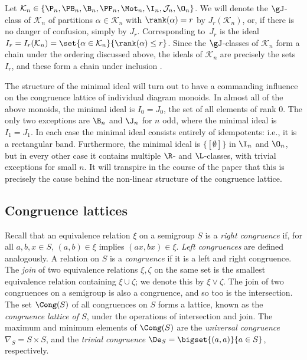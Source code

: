 Let $\mathcal{K}_n\in\{\P_n,\PB_n,\B_n,\PP_n,\Mot_n,\I_n,\mathcal J_n,\O_n\}$.
We will denote the $\gJ$-class of $\mathcal{K}_n$ of partitions $\alpha\in\mathcal{K}_n$ with $\rank(\alpha)=r$ by $J_r(\mathcal{K}_n)$, or, if there is no danger of confusion, simply by $J_r$.
Corresponding to~$J_r$ is the ideal 
$I_r=I_r(\mathcal{K}_n)=\set{\alpha\in\mathcal{K}_n}{\rank(\alpha)\leq r}$.
Since the $\gJ$-classes of $\mathcal K_n$ form a chain under the ordering discussed above, the ideals of $\mathcal K_n$ are precisely the sets $I_r$, and these form a chain under inclusion \cite[Proposition 2.6]{DEG2017}.

The structure of the minimal ideal will turn out to have a commanding influence on
the congruence lattice of individual diagram monoids.
In almost all of the above monoids, the minimal ideal is $I_0=J_0$, the set of all elements of rank $0$.
The only two exceptions are $\B_n$ and $\J_n$ for $n$ odd, where the minimal ideal is $I_1=J_1$.
In each case the minimal ideal consists entirely of idempotents: i.e., it is a rectangular band.
Furthermore, the minimal ideal is $\{[\emptyset]\}$ in $\I_n$ and
$\O_n$, but in every other case it contains multiple $\R$- and $\L$-classes, with trivial exceptions for small $n$.
It will transpire in the course of the paper that this is precisely the
cause behind the non-linear structure of the congruence lattice.






\subsection{Congruence lattices}\label{sec:prelim_congruences}


Recall that an equivalence relation $\xi$ on a semigroup $S$ is a \emph{right
congruence} if, for all $a,b,x\in S$, $(a,b)\in\xi$ implies $(ax,bx)\in\xi$.
\emph{Left congruences} are defined analogously.  A relation on $S$ is a
\emph{congruence} if it is a left and right congruence.  The \emph{join} of two
equivalence relations $\xi,\zeta$ on the same set is the smallest equivalence
relation containing $\xi\cup\zeta$; we denote this by $\xi\vee\zeta$.  The join
of two congruences on a semigroup is also a congruence, and so too is the
intersection.  The set $\Cong(S)$ of all congruences on $S$ forms a lattice,
known as the \emph{congruence lattice of $S$}, under the operations of
intersection and join.  The maximum and minimum elements of $\Cong(S)$ are 
the \emph{universal congruence} ${\nabla_S=S\times S}$, and the \emph{trivial congruence} $\De_S=\bigset{(a,a)}{a\in S}$, respectively.  


